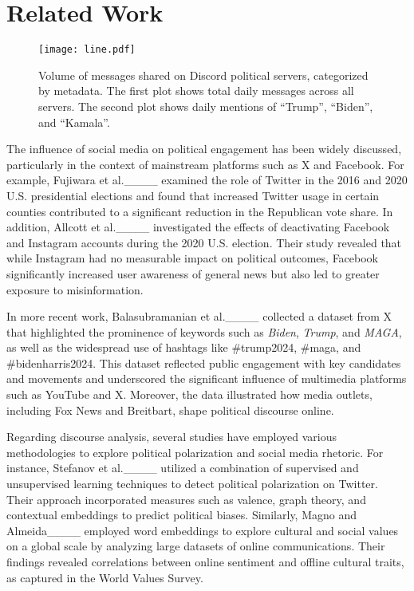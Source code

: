 \section{Related Work}
\label{sec:related_work}

\begin{figure*}[!ht]
    \centering
    \texttt{[image: line.pdf]}
    \caption{Volume of messages shared on Discord political servers, categorized by metadata. The first plot shows total daily messages across all servers. The second plot shows daily mentions of ``Trump'', ``Biden'', and ``Kamala''.}
    \label{fig:line-plot}
\end{figure*}


The influence of social media on political engagement has been widely discussed, particularly in the context of mainstream platforms such as X and Facebook. For example, Fujiwara et al.____ examined the role of Twitter in the 2016 and 2020 U.S. presidential elections and found that increased Twitter usage in certain counties contributed to a significant reduction in the Republican vote share. In addition, Allcott et al.____ investigated the effects of deactivating Facebook and Instagram accounts during the 2020 U.S. election. Their study revealed that while Instagram had no measurable impact on political outcomes, Facebook significantly increased user awareness of general news but also led to greater exposure to misinformation.


In more recent work, Balasubramanian et al.____ collected a dataset from X that highlighted the prominence of keywords such as \emph{Biden}, \emph{Trump}, and \emph{MAGA}, as well as the widespread use of hashtags like \#trump2024, \#maga, and \#bidenharris2024. This dataset reflected public engagement with key candidates and movements and underscored the significant influence of multimedia platforms such as YouTube and X. Moreover, the data illustrated how media outlets, including Fox News and Breitbart, shape political discourse online.

Regarding discourse analysis, several studies have employed various methodologies to explore political polarization and social media rhetoric. For instance, Stefanov et al.____ utilized a combination of supervised and unsupervised learning techniques to detect political polarization on Twitter. Their approach incorporated measures such as valence, graph theory, and contextual embeddings to predict political biases. Similarly, Magno and Almeida____ employed word embeddings to explore cultural and social values on a global scale by analyzing large datasets of online communications. Their findings revealed correlations between online sentiment and offline cultural traits, as captured in the World Values Survey.


